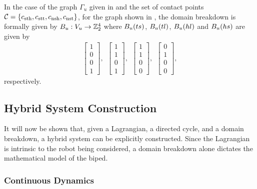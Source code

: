 \gap

\begin{exmp} \label{ex:domainbreakdown}
  In the case of the graph $\Gamma_{u}$ given in  and the set of contact points $\mathcal{C} =  \{c_{\mathrm{sth}}, c_{\mathrm{stt}}, c_{\mathrm{nsh}}, c_{\mathrm{nst}}\}$, for the graph shown in , the domain breakdown is formally given by $B_{u} : V_{u} \to \mathbb{Z}_{2}^{4}$ where $B_{u}(ts)$, $B_{u}(tl)$, $B_{u}(hl)$ and $B_{u}(hs)$ are given by
  \begin{align}
    \left[ \begin{array}{c} 1  \\ 0 \\ 0 \\ 1 \end{array} \right], \:\:
    \left[ \begin{array}{c} 1  \\ 1 \\ 0 \\ 1 \end{array} \right], \:\:
    \left[ \begin{array}{c} 1  \\ 1 \\ 0 \\ 0 \end{array} \right], \:\:
    \left[ \begin{array}{c} 0  \\ 1 \\ 0 \\ 0 \end{array} \right],
    \label{eq:domainbreakdownvectors}
  \end{align}
  respectively.
\end{exmp}


\subsection{Hybrid System Construction}

It will now be shown that, given a Lagrangian, a directed cycle, and a domain breakdown, a hybrid system can be explicitly constructed.
%
Since the Lagrangian is intrinsic to the robot being considered, a domain breakdown alone dictates the mathematical model of the biped.


\subsubsection{Continuous Dynamics}

